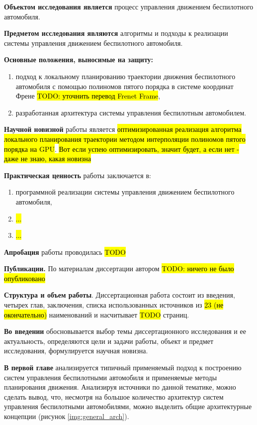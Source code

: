 \textbf{Объектом исследования является} процесс управления движением беспилотного автомобиля.

\textbf{Предметом исследования являются} алгоритмы и подходы к реализации системы управления движением
беспилотного автомобиля.

\textbf{Основные положения, выносимые на защиту:}
\begin{enumerate}
    \item подход к локальному планированию траектории движения беспилотного автомобиля с помощью
          полиномов пятого порядка в системе координат Френе \hl{TODO: уточнить перевод Frenet Frame},
    \item разработанная архитектура системы управления беспилотным автомобилем.
\end{enumerate}

\textbf{Научной новизной} работы является \hl{оптимизированная реализация алгоритма локального планирования
    траектории методом интерполяции полиномов пятого порядка на GPU}.
\hl{Вот если успею оптимизировать, значит будет, а если нет - даже не знаю, какая новизна}

\textbf{Практическая ценность} работы заключается в:
\begin{enumerate}
    \item программной реализации системы управления движением беспилотного автомобиля,
    \item \hl{...}
    \item \hl{...}
\end{enumerate}

\textbf{Апробация} работы проводилась \hl{TODO}

\textbf{Публикации.} По материалам диссертации автором \hl{TODO: ничего не было опубликовано}

\textbf{Структура и объем работы}. Диссертационная работа состоит из введения, четырех глав, заключения,
списка использованных источников из \hl{23 (не окончательно)} наименований и насчитывает \hl{TODO} страниц.

\textbf{Во введении} обосновывается выбор темы диссертационного исследования и ее актуальность,
определяются цели и задачи работы, объект и предмет исследования, формулируется научная новизна.

\textbf{В первой главе} анализируется типичный применяемый подход к построению систем управления
беспилотными автомобиля и применяемые методы планирования движения. Анализируя источники по данной тематике,
можно сделать вывод, что, несмотря на большое количество архитектур систем управления беспилотными
автомобилями, можно выделить общие архитектурные концепции (рисунок \ref{img:general_arch}).


